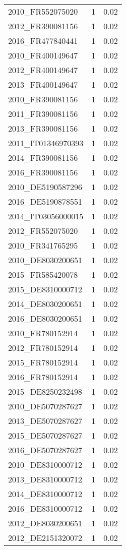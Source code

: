 \begin{table*}[htbp]
\begin{tabular}{lrr}
2010_FR552075020 & 1 & 0.02 \\
2012_FR390081156 & 1 & 0.02 \\
2016_FR477840441 & 1 & 0.02 \\
2010_FR400149647 & 1 & 0.02 \\
2012_FR400149647 & 1 & 0.02 \\
2013_FR400149647 & 1 & 0.02 \\
2010_FR390081156 & 1 & 0.02 \\
2011_FR390081156 & 1 & 0.02 \\
2013_FR390081156 & 1 & 0.02 \\
2011_IT01346970393 & 1 & 0.02 \\
2014_FR390081156 & 1 & 0.02 \\
2016_FR390081156 & 1 & 0.02 \\
2010_DE5190587296 & 1 & 0.02 \\
2016_DE5190878551 & 1 & 0.02 \\
2014_IT03056000015 & 1 & 0.02 \\
2012_FR552075020 & 1 & 0.02 \\
2010_FR341765295 & 1 & 0.02 \\
2010_DE8030200651 & 1 & 0.02 \\
2015_FR585420078 & 1 & 0.02 \\
2015_DE8310000712 & 1 & 0.02 \\
2014_DE8030200651 & 1 & 0.02 \\
2016_DE8030200651 & 1 & 0.02 \\
2010_FR780152914 & 1 & 0.02 \\
2012_FR780152914 & 1 & 0.02 \\
2015_FR780152914 & 1 & 0.02 \\
2016_FR780152914 & 1 & 0.02 \\
2015_DE8250232498 & 1 & 0.02 \\
2010_DE5070287627 & 1 & 0.02 \\
2013_DE5070287627 & 1 & 0.02 \\
2015_DE5070287627 & 1 & 0.02 \\
2016_DE5070287627 & 1 & 0.02 \\
2010_DE8310000712 & 1 & 0.02 \\
2013_DE8310000712 & 1 & 0.02 \\
2014_DE8310000712 & 1 & 0.02 \\
2016_DE8310000712 & 1 & 0.02 \\
2012_DE8030200651 & 1 & 0.02 \\
2012_DE2151320072 & 1 & 0.02 \\

\end{tabular}
\end{table*}
